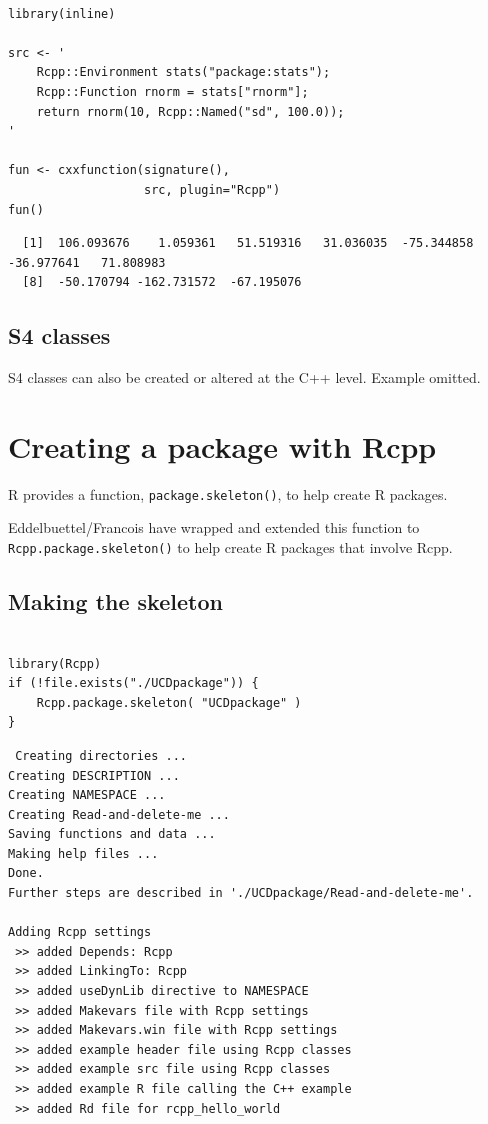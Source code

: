 \documentclass[11pt]{article}
\begin{document}
\begin{verbatim}

library(inline)

src <- '
    Rcpp::Environment stats("package:stats");
    Rcpp::Function rnorm = stats["rnorm"];
    return rnorm(10, Rcpp::Named("sd", 100.0));
'

fun <- cxxfunction(signature(),
                   src, plugin="Rcpp")
fun()
\end{verbatim}

\begin{verbatim}
  [1]  106.093676    1.059361   51.519316   31.036035  -75.344858  -36.977641   71.808983
  [8]  -50.170794 -162.731572  -67.195076
\end{verbatim}
\subsection{S4 classes}
\label{sec-7-5}


S4 classes can also be created or altered at the C++ level.  Example
omitted.
\section{Creating a package with Rcpp}
\label{sec-8}


R provides a function, \texttt{package.skeleton()}, to help create R
packages.

Eddelbuettel/Francois have wrapped and extended this function to
\texttt{Rcpp.package.skeleton()} to help create R packages that involve Rcpp.
\subsection{Making the skeleton}
\label{sec-8-1}



\begin{verbatim}

library(Rcpp)
if (!file.exists("./UCDpackage")) {
    Rcpp.package.skeleton( "UCDpackage" )
}
\end{verbatim}


\begin{verbatim}
 Creating directories ...
Creating DESCRIPTION ...
Creating NAMESPACE ...
Creating Read-and-delete-me ...
Saving functions and data ...
Making help files ...
Done.
Further steps are described in './UCDpackage/Read-and-delete-me'.

Adding Rcpp settings
 >> added Depends: Rcpp
 >> added LinkingTo: Rcpp
 >> added useDynLib directive to NAMESPACE
 >> added Makevars file with Rcpp settings
 >> added Makevars.win file with Rcpp settings
 >> added example header file using Rcpp classes
 >> added example src file using Rcpp classes
 >> added example R file calling the C++ example
 >> added Rd file for rcpp_hello_world
\end{verbatim}
\end{document}
